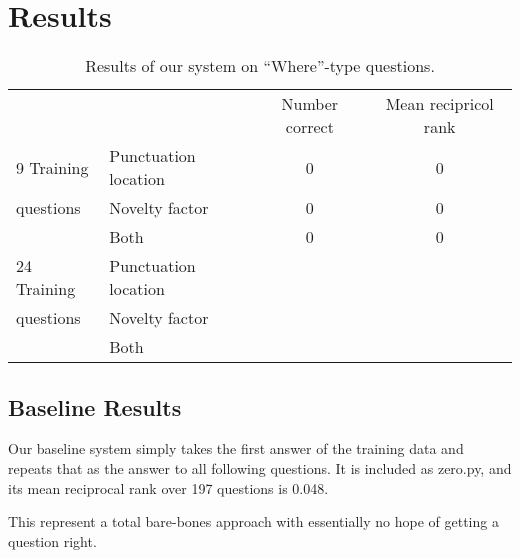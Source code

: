 \documentclass{article}
\begin{document}
\section{Results}
\begin{table}
\begin{tabular}{llcc}
\cmidrule{2-4}
               &       & Number correct & Mean recipricol rank\\
\cmidrule{2-4}
9 Training&Punctuation location &   0            &      0              \\
questions&Novelty factor       &    0           &       0             \\
&Both                 &             0  &                0    \\
\cmidrule{2-4}
24 Training&Punctuation location &                &                     \\
questions&Novelty factor       &                &                     \\
&Both                 &                &                     \\
\cmidrule{2-4}
\end{tabular}
\caption{\label{tab:results}Results of our system on ``Where''-type questions. }
\end{table}

\subsection{Baseline Results}
Our baseline system simply takes the first answer of the training data and
repeats that as the answer to all following questions. It is included as
zero.py, and its mean reciprocal rank over 197 questions is 0.048.  

This represent a total bare-bones approach with essentially no hope of getting a
question right.
\end{document}
